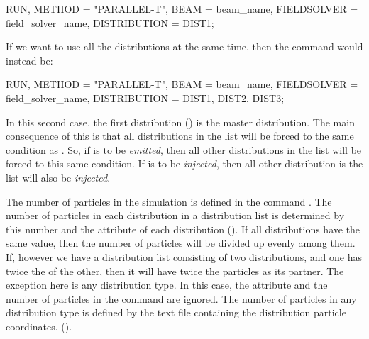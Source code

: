 \begin{example}
RUN, METHOD = "PARALLEL-T",
     BEAM = beam_name,
     FIELDSOLVER = field_solver_name,
     DISTRIBUTION = DIST1;
\end{example}
If we want to use all the distributions at the same time, then the command would instead be:

\begin{example}
RUN, METHOD = "PARALLEL-T",
     BEAM = beam_name,
     FIELDSOLVER = field_solver_name,
     DISTRIBUTION = {DIST1, DIST2, DIST3};
\end{example}
In this second case, the first distribution () is the master distribution. The main consequence of this is that
all distributions in the list will be forced to the same  condition as . So, if 
is to be \emph{emitted}, then all other distributions in the list will be forced to this same condition. If  is
to be \emph{injected}, then all other distribution is the list will also be \emph{injected}.

The number of particles in the simulation is defined in the  command . The number
of particles in each distribution in a distribution list is determined by this number and the  attribute
of each distribution (). If all distributions have the same  value, then
the number of particles will be divided up evenly among them. If, however we have a distribution list consisting of
two distributions, and one has twice the  of the other, then it will have twice the particles as its partner.
The exception here is any  distribution type. In this case, the  attribute and the number of
particles in the  command are ignored. The number of particles in any  distribution type is
defined by the text file containing the distribution particle coordinates. ().


